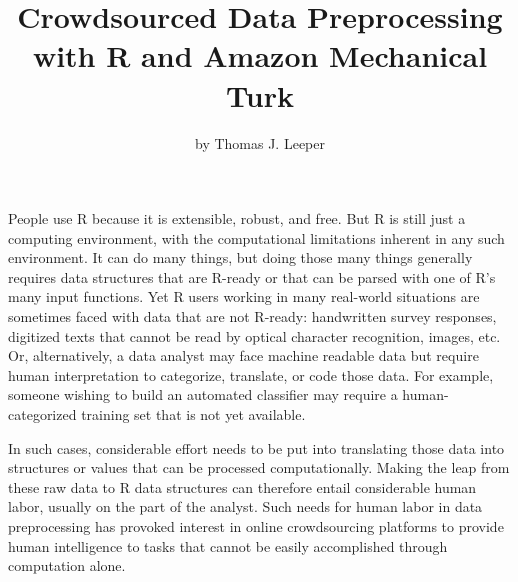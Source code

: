 \title{Crowdsourced Data Preprocessing with R and Amazon Mechanical Turk}
\author{by Thomas J. Leeper}

\maketitle


People use R because it is extensible, robust, and free. But R is still just a computing environment, with the computational limitations inherent in any such environment. It can do many things, but doing those many things generally requires data structures that are R-ready or that can be parsed with one of R's many input functions. Yet R users working in many real-world situations are sometimes faced with data that are not R-ready: handwritten survey responses, digitized texts that cannot be read by optical character recognition, images, etc. Or, alternatively, a data analyst may face machine readable data but require human interpretation to categorize, translate, or code those data. For example, someone wishing to build an automated classifier may require a human-categorized training set that is not yet available.

In such cases, considerable effort needs to be put into translating those data into structures or values that can be processed computationally. Making the leap from these raw data to R data structures can therefore entail considerable human labor, usually on the part of the analyst. Such needs for human labor in data preprocessing has provoked interest in online crowdsourcing platforms \citep{Schmidt2010, ChenMenezesBradley2011} to provide human intelligence to tasks that cannot be easily accomplished through computation alone. 

